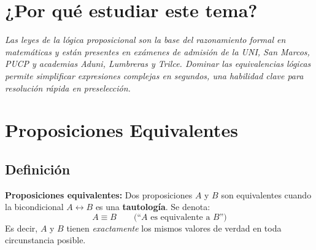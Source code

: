 

\section*{¿Por qué estudiar este tema?}
\begin{tcolorbox}[
  enhanced, colback=AzulClaro!30, colframe=AzulMedio,
  arc=3pt, boxrule=0.6pt, left=10pt, right=10pt, top=6pt, bottom=6pt
]
\textit{Las leyes de la lógica proposicional son la base del razonamiento
formal en matemáticas y están presentes en exámenes de admisión de la UNI,
San Marcos, PUCP y academias Aduni, Lumbreras y Trilce. Dominar las
equivalencias lógicas permite simplificar expresiones complejas en segundos,
una habilidad clave para resolución rápida en preselección.}
\end{tcolorbox}
\vspace{0.5cm}

\section{Proposiciones Equivalentes}

\subsection{Definición}

\begin{cajadef}
  \textbf{Proposiciones equivalentes:} Dos proposiciones $A$ y $B$ son
  equivalentes cuando la bicondicional $A \leftrightarrow B$ es una
  \textbf{tautología}. Se denota:
  \[
    A \equiv B \qquad \text{(``$A$ es equivalente a $B$'')}
  \]
  Es decir, $A$ y $B$ tienen \textit{exactamente} los mismos valores de
  verdad en toda circunstancia posible.
\end{cajadef}

